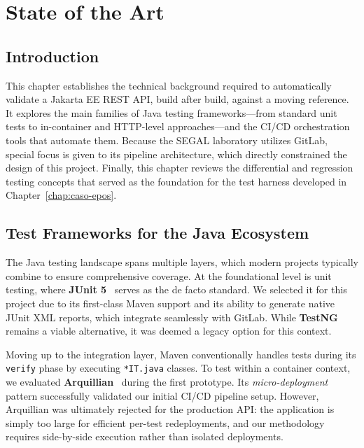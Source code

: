 \chapter{State of the Art}
\label{chap:estado-da-arte}

\section{Introduction}
\label{chap2:sec:intro}

This chapter establishes the technical background required to automatically validate
a Jakarta EE \ac{REST} \ac{API}, build after build, against a moving reference.
It explores the main families of Java testing frameworks—from standard unit
tests to in-container and \ac{HTTP}-level approaches—and the \ac{CI}/\ac{CD}
orchestration tools that automate them. Because the \ac{SEGAL} laboratory utilizes
GitLab, special focus is given to its pipeline architecture, which directly constrained
the design of this project. Finally, this chapter reviews the differential and
regression testing concepts that served as the foundation for the test harness
developed in Chapter~\ref{chap:caso-epos}.

\section{Test Frameworks for the Java Ecosystem}
\label{sec:soa-tests}

The Java testing landscape spans multiple layers, which modern projects typically
combine to ensure comprehensive coverage. At the foundational level is unit
testing, where \textbf{JUnit 5}~\cite{junit5} serves as the de facto
standard. We selected it for this project due to its first-class Maven support
and its ability to generate native JUnit XML reports, which integrate
seamlessly with GitLab. While \textbf{TestNG}~\cite{testng} remains a
viable alternative, it was deemed a legacy option for this context.

Moving up to the integration layer, Maven conventionally handles tests
during its \texttt{verify} phase by executing \texttt{*IT.java} classes. To test
within a container context, we evaluated \textbf{Arquillian}~\cite{arquillian}
during the first prototype. Its \emph{micro-deployment} pattern successfully
validated our initial \ac{CI}/\ac{CD} pipeline setup. However, Arquillian was
ultimately rejected for the production \ac{API}: the application is simply too
large for efficient per-test redeployments, and our methodology requires
side-by-side execution rather than isolated deployments.

